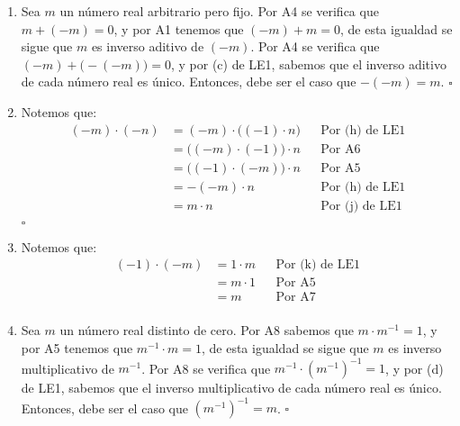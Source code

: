 \documentclass[11pt]{article}
\begin{document}
\begin{enumerate}[label=\alph*), font=\bfseries]
    \item Sea $m$ un número real arbitrario pero fijo. Por A4 se verifica que $m + (-m) = 0$, y por A1 tenemos que $(-m) + m = 0$, de esta igualdad se sigue que $m$ es inverso aditivo de $(-m)$. Por A4 se verifica que $(-m) + \bigl(-(-m)\bigr) = 0$, y por (c) de LE1, sabemos que el inverso aditivo de cada número real es único. Entonces, debe ser el caso que $-(-m) = m$.
    \mbox{}\hfill $\square$

    \item Notemos que:
    \begin{align*}
        (-m) \cdot (-n) &= (-m) \cdot \bigl( (-1) \cdot n \bigr) && \text{Por (h) de LE1}\\
        &= \bigl( (-m) \cdot (-1) \bigr) \cdot n && \text{Por A6}\\
        &= \bigl( (-1) \cdot (-m) \bigr) \cdot n && \text{Por A5}\\
        &= -(-m) \cdot n && \text{Por (h) de LE1}\\
        &= m \cdot n && \text{Por (j) de LE1}\\
    \end{align*}
    \mbox{}\hfill $\square$

    \item Notemos que:
    \begin{align*}
        (-1) \cdot (-m) &= 1 \cdot m && \text{Por (k) de LE1}\\
        &= m \cdot 1 && \text{Por A5}\\
        &= m && \text{Por A7}\\
    \end{align*}

    \item Sea $m$ un número real distinto de cero. Por A8 sabemos que $m \cdot m^{-1}=1$, y por A5 tenemos que $m^{-1} \cdot m=1$, de esta igualdad se sigue que $m$ es inverso multiplicativo de $m^{-1}$. Por A8 se verifica que $ m^{-1} \cdot \left( m^{-1} \right)^{-1} =1$, y por (d) de LE1, sabemos que el inverso multiplicativo de cada número real es único. Entonces, debe ser el caso que $\left( m^{-1} \right )^{-1}=m$.
    \mbox{}\hfill $\square$


\end{enumerate}
\end{document}

